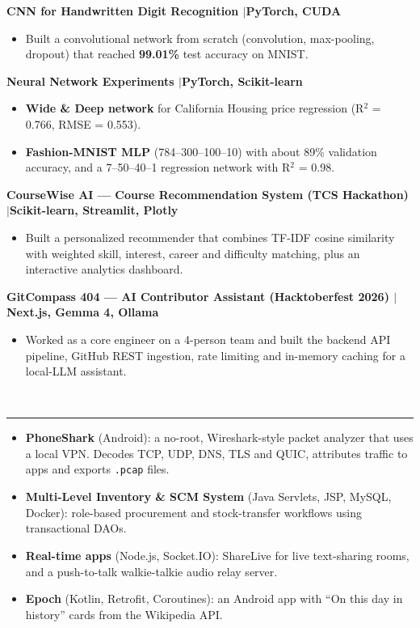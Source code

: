 \documentclass[10pt,a4paper]{article}
\renewcommand{\section}[1]{\vspace{6pt}{\large\bfseries\MakeUppercase{#1}}\\[-7pt]\rule{\textwidth}{0.6pt}\vspace{2pt}}
\newcommand{\entry}[2]{\par\textbf{#1}\hfill #2\par}
\newenvironment{points}{\vspace{-4pt}\begin{itemize}\setlength{\itemsep}{0pt}\setlength{\parskip}{0pt}\setlength{\topsep}{0pt}\setlength{\partopsep}{0pt}\setlength{\leftmargin}{12pt}}{\end{itemize}\vspace{-2pt}}
\newcommand{\sep}{\enspace$|$\enspace}
\begin{document}
\entry{CNN for Handwritten Digit Recognition \textnormal{\sep PyTorch, CUDA}}{}
\begin{points}
  \item Built a convolutional network from scratch (convolution, max-pooling, dropout) that reached \textbf{99.01\%} test accuracy on MNIST.
\end{points}
\entry{Neural Network Experiments \textnormal{\sep PyTorch, Scikit-learn}}{}
\begin{points}
  \item \textbf{Wide \& Deep network} for California Housing price regression (R$^2$ = 0.766, RMSE = 0.553).
  \item \textbf{Fashion-MNIST MLP} (784--300--100--10) with about 89\% validation accuracy, and a 7--50--40--1 regression network with R$^2$ = 0.98.
\end{points}
\entry{CourseWise AI --- Course Recommendation System (TCS Hackathon) \textnormal{\sep Scikit-learn, Streamlit, Plotly}}{}
\begin{points}
  \item Built a personalized recommender that combines TF-IDF cosine similarity with weighted skill, interest, career and difficulty matching, plus an interactive analytics dashboard.
\end{points}
\entry{GitCompass 404 --- AI Contributor Assistant (Hacktoberfest 2026) \textnormal{\sep Next.js, Gemma 4, Ollama}}{}
\begin{points}
  \item Worked as a core engineer on a 4-person team and built the backend API pipeline, GitHub REST ingestion, rate limiting and in-memory caching for a local-LLM assistant.
\end{points}

\section{Other Projects}
\begin{points}
  \item \textbf{PhoneShark} (Android): a no-root, Wireshark-style packet analyzer that uses a local VPN. Decodes TCP, UDP, DNS, TLS and QUIC, attributes traffic to apps and exports \texttt{.pcap} files.
  \item \textbf{Multi-Level Inventory \& SCM System} (Java Servlets, JSP, MySQL, Docker): role-based procurement and stock-transfer workflows using transactional DAOs.
  \item \textbf{Real-time apps} (Node.js, Socket.IO): ShareLive for live text-sharing rooms, and a push-to-talk walkie-talkie audio relay server.
  \item \textbf{Epoch} (Kotlin, Retrofit, Coroutines): an Android app with ``On this day in history'' cards from the Wikipedia API.
\end{points}
\end{document}
